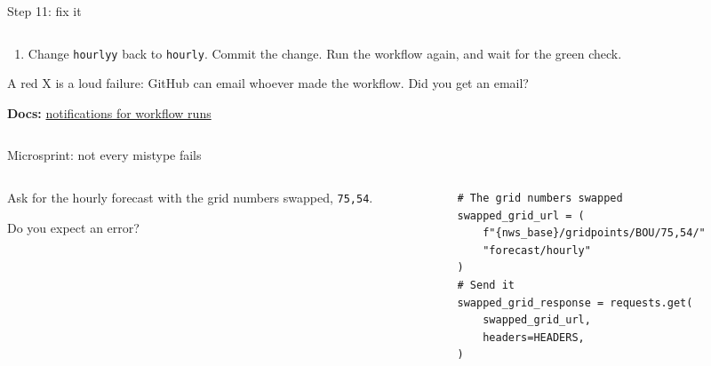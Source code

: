 \documentclass[9pt,aspectratio=169]{beamer}
\begin{document}
\begin{frame}{Step 11: fix it}
    \begin{columns}[T]
        \begin{column}{0.6\textwidth}
            \begin{enumerate}\small\setcounter{enumi}{2}
                \item Change \texttt{hourlyy} back to \texttt{hourly}. Commit the change. Run the workflow again, and wait for the green check.
            \end{enumerate}
            \medskip
            A red X is a loud failure: GitHub can email whoever made the workflow. Did you get an email?

            \medskip
            {\scriptsize\textbf{Docs:} \href{https://docs.github.com/en/actions/concepts/workflows-and-actions/notifications-for-workflow-runs}{notifications for workflow runs}\par}
        \end{column}
        \begin{column}{0.35\textwidth}
        \end{column}
    \end{columns}
\end{frame}

\begin{frame}[fragile]{Microsprint: not every mistype fails}
    \begin{columns}[T]
        \begin{column}{0.37\textwidth}
            Ask for the hourly forecast with the grid numbers swapped, \texttt{75,54}.

            \medskip
            Do you expect an error?
        \end{column}
        \begin{column}{0.6\textwidth}
\begin{lstlisting}
# The grid numbers swapped
swapped_grid_url = (
    f"{nws_base}/gridpoints/BOU/75,54/"
    "forecast/hourly"
)
# Send it
swapped_grid_response = requests.get(
    swapped_grid_url,
    headers=HEADERS,
)
\end{lstlisting}
        \end{column}
    \end{columns}
\end{frame}
\end{document}
